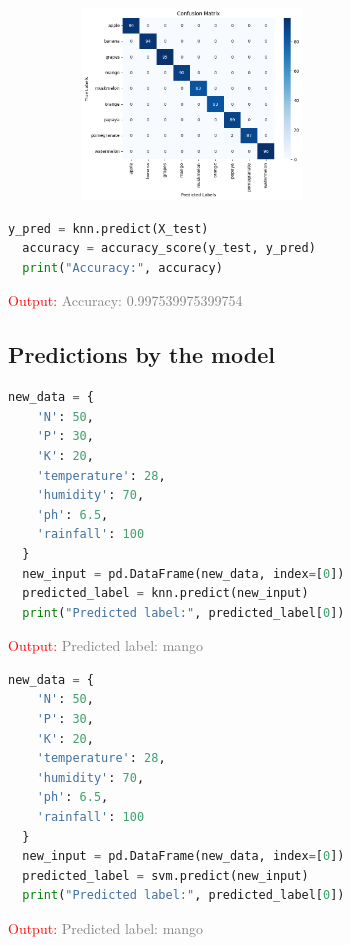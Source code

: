 \begin{figure}[h]
\centering
 \footnotesize
 \includegraphics[width=3in,height=2in]{confusion.png}
\label{fig:dunnhalftone}
\end{figure}

\begin{lstlisting}[language=Python]
  y_pred = knn.predict(X_test)
  accuracy = accuracy_score(y_test, y_pred)
  print("Accuracy:", accuracy)
\end{lstlisting}

\hspace{2in}\textcolor{red}{Output:}
\newline
\hspace{2in}\textcolor{grey}{Accuracy: 0.997539975399754}
\subsection*{Predictions by the model}
\textcolor{green}{\hspace{0.5cm}{Using KNN  Algorithm:}}
\begin{lstlisting}[language=Python]
  new_data = {
    'N': 50,  
    'P': 30,  
    'K': 20, 
    'temperature': 28,  
    'humidity': 70,  
    'ph': 6.5,  
    'rainfall': 100  
  }
  new_input = pd.DataFrame(new_data, index=[0])
  predicted_label = knn.predict(new_input)
  print("Predicted label:", predicted_label[0])
\end{lstlisting}
 
\hspace{2in}\textcolor{red}{Output:}
\newline
\hspace{2in}\textcolor{grey}{Predicted label: mango}
\newline
\textcolor{green}{\hspace{0.5cm}{Using SVM Algorithm:}}
\begin{lstlisting}[language=Python]
  new_data = {
    'N': 50,  
    'P': 30,  
    'K': 20, 
    'temperature': 28,  
    'humidity': 70,  
    'ph': 6.5,  
    'rainfall': 100  
  }
  new_input = pd.DataFrame(new_data, index=[0])
  predicted_label = svm.predict(new_input)
  print("Predicted label:", predicted_label[0])

\end{lstlisting}
\hspace{2in}\textcolor{red}{Output:}
\newline
\hspace{2in}\textcolor{grey}{Predicted label: mango}